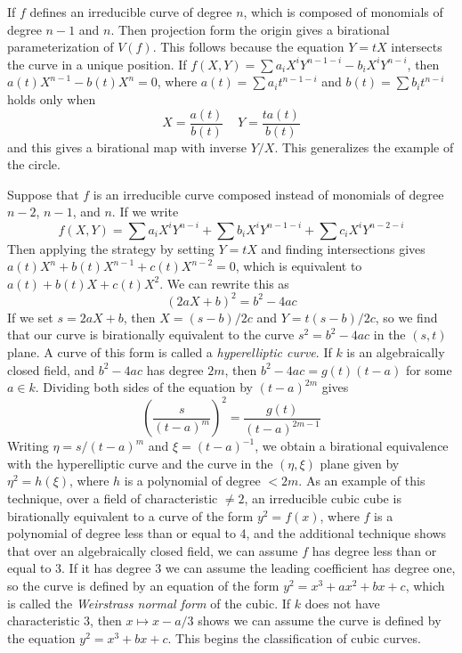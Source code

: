 \begin{example}
    If $f$ defines an irreducible curve of degree $n$, which is composed of monomials of degree $n-1$ and $n$. Then projection form the origin gives a birational parameterization of $V(f)$. This follows because the equation $Y = tX$ intersects the curve in a unique position. If $f(X,Y) = \sum a_i X^iY^{n-1-i} - b_i X^iY^{n-i}$, then $a(t) X^{n-1} - b(t) X^n = 0$, where $a(t) = \sum a_i t^{n-1-i}$ and $b(t) = \sum b_i t^{n-i}$ holds only when
    \[  X = \frac{a(t)}{b(t)}\ \ \ \ \ Y = \frac{ta(t)}{b(t)} \]
    and this gives a birational map with inverse $Y/X$. This generalizes the example of the circle.
\end{example}

\begin{example}
    Suppose that $f$ is an irreducible curve composed instead of monomials of degree $n-2$, $n-1$, and $n$. If we write
    \[ f(X,Y) = \sum a_i X^iY^{n-i} + \sum b_i X^iY^{n-1-i} + \sum c_i X^iY^{n-2-i}  \]
    Then applying the strategy by setting $Y = tX$ and finding intersections gives $a(t) X^n + b(t) X^{n-1} + c(t) X^{n-2} = 0$, which is equivalent to $a(t) + b(t)X + c(t)X^2$. We can rewrite this as
    \[ \left( 2aX + b \right)^2 = b^2 - 4ac \]
    If we set $s = 2aX + b$, then $X = (s-b)/2c$ and $Y = t(s-b)/2c$, so we find that our curve is birationally equivalent to the curve $s^2 = b^2 - 4ac$ in the $(s,t)$ plane. A curve of this form is called a \emph{hyperelliptic curve}. If $k$ is an algebraically closed field, and $b^2 - 4ac$ has degree $2m$, then $b^2 - 4ac = g(t)(t - a)$ for some $a \in k$. Dividing both sides of the equation by $(t-a)^{2m}$ gives
    \[ \left( \frac{s}{(t-a)^m} \right)^2 = \frac{g(t)}{(t-a)^{2m-1}} \]
    Writing $\eta = s/(t-a)^m$ and $\xi = (t-a)^{-1}$, we obtain a birational equivalence with the hyperelliptic curve and the curve in the $(\eta, \xi)$ plane given by $\eta^2 = h(\xi)$, where $h$ is a polynomial of degree $< 2m$. As an example of this technique, over a field of characteristic $\neq 2$, an irreducible cubic cube is birationally equivalent to a curve of the form $y^2 = f(x)$, where $f$ is a polynomial of degree less than or equal to 4, and the additional technique shows that over an algebraically closed field, we can assume $f$ has degree less than or equal to 3. If it has degree 3 we can assume the leading coefficient has degree one, so the curve is defined by an equation of the form $y^2 = x^3 + ax^2 + bx + c$, which is called the \emph{Weirstrass normal form} of the cubic. If $k$ does not have characteristic 3, then $x \mapsto x - a/3$ shows we can assume the curve is defined by the equation $y^2 = x^3 + bx + c$. This begins the classification of cubic curves.
\end{example}

